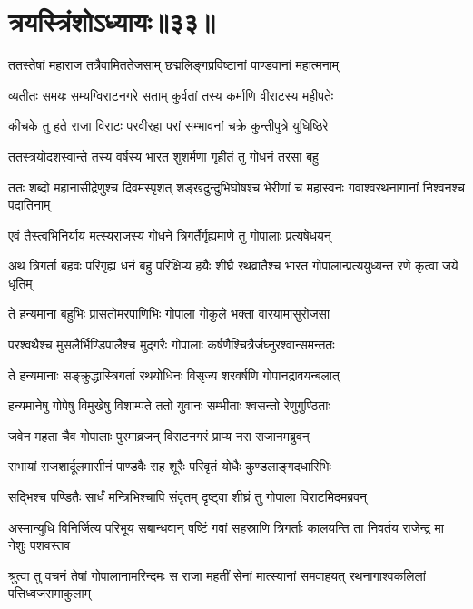 \chapter{त्रयस्त्रिंशोऽध्यायः॥३३॥}

\twolineshloka
{ततस्तेषां महाराज तत्रैवामिततेजसाम्}
{छद्मलिङ्गप्रविष्टानां पाण्डवानां महात्मनाम्}


\twolineshloka
{व्यतीतः समयः सम्यग्विराटनगरे सताम्}
{कुर्वतां तस्य कर्माणि वीराटस्य महीपतेः}


\twolineshloka
{कीचके तु हते राजा विराटः परवीरहा}
{परां सम्भावनां चक्रे कुन्तीपुत्रे युधिष्ठिरे}


\twolineshloka
{ततस्त्रयोदशस्वान्ते तस्य वर्षस्य भारत}
{शुशर्मणा गृहीतं तु गोधनं तरसा बहु}


\threelineshloka
{ततः शब्दो महानासीद्रेणुश्च दिवमस्पृशत्}
{शङ्खदुन्दुभिघोषश्च भेरीणां च महास्वनः}
{गवाश्वरथनागानां निश्वनश्च पदातिनाम्}


\twolineshloka
{एवं तैस्त्वभिनिर्याय मत्स्यराजस्य गोधने}
{त्रिगर्तैर्गृह्यमाणे तु गोपालाः प्रत्यषेधयन्}


\threelineshloka
{अथ त्रिगर्ता बहवः परिगृह्य धनं बहु}
{परिक्षिप्य हयैः शीघ्रै रथव्रातैश्च भारत}
{गोपालान्प्रत्ययुध्यन्त रणे कृत्वा जये धृतिम्}


\twolineshloka
{ते हन्यमाना बहुभिः प्रासतोमरपाणिभिः}
{गोपाला गोकुले भक्ता वारयामासुरोजसा}


\twolineshloka
{परश्वथैश्च मुसलैर्भिण्डिपालैश्च मुद्गरैः}
{गोपालाः कर्षणैश्चित्रैर्जघ्नुरश्वान्समन्ततः}


\twolineshloka
{ते हन्यमानाः सङ्क्रुद्धास्त्रिगर्ता रथयोधिनः}
{विसृज्य शरवर्षणि गोपानद्रावयन्बलात्}


\twolineshloka
{हन्यमानेषु गोपेषु विमुखेषु विशाम्पते}
{ततो युवानः सम्भीताः श्वसन्तो रेणुगुण्ठिताः}


\twolineshloka
{जवेन महता चैव गोपालाः पुरमाव्रजन्}
{विराटनगरं प्राप्य नरा राजानमब्रुवन्}


\twolineshloka
{सभायां राजशार्दूलमासीनं पाण्डवैः सह}
{शूरैः परिवृतं योधैः कुण्डलाङ्गदधारिभिः}


\twolineshloka
{सद्भिश्च पण्डितैः सार्धं मन्त्रिभिश्चापि संवृतम्}
{दृष्ट्वा शीघ्रं तु गोपाला विराटमिदमब्रवन्}


\threelineshloka
{अस्मान्युधि विनिर्जित्य परिभूय सबान्धवान्}
{षष्टिं गवां सहस्राणि त्रिगर्ताः कालयन्ति}
{ता निवर्तय राजेन्द्र मा नेशुः पशवस्तव}



\threelineshloka
{श्रुत्वा तु वचनं तेषां गोपालानामरिन्दमः}
{स राजा महतीं सेनां मात्स्यानां समवाहयत्}
{रथनागाश्वकलिलां पत्तिध्वजसमाकुलाम्}


